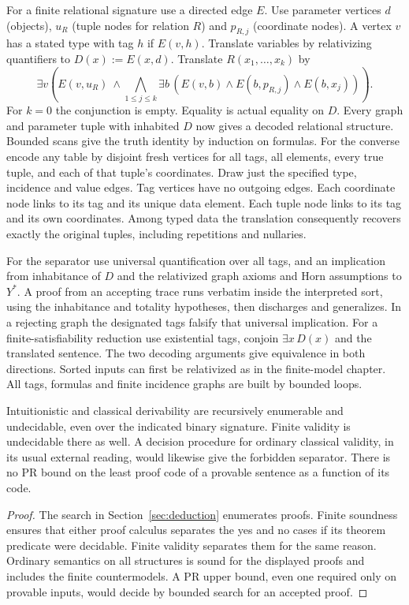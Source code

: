 For a finite relational signature use a directed edge $E$. Use parameter vertices $d$ (objects), $u_R$ (tuple nodes for relation $R$) and $p_{R,j}$ (coordinate nodes). A vertex $v$ has a stated type with tag $h$ if $E(v,h)$. Translate variables by relativizing quantifiers to $D(x):=E(x,d)$. Translate $R(x_1,\ldots,x_k)$ by
\[
 \exists v\left(E(v,u_R)\ \wedge \bigwedge_{1\le j\le k}\exists b\,
       (E(v,b)\wedge E(b,p_{R,j})\wedge E(b,x_j))\right).
\]
For $k=0$ the conjunction is empty. Equality is actual equality on $D$. Every graph and parameter tuple with inhabited $D$ now gives a decoded relational structure. Bounded scans give the truth identity by induction on formulas. For the converse encode any table by disjoint fresh vertices for all tags, all elements, every true tuple, and each of that tuple's coordinates. Draw just the specified type, incidence and value edges. Tag vertices have no outgoing edges. Each coordinate node links to its tag and its unique data element. Each tuple node links to its tag and its own coordinates. Among typed data the translation consequently recovers exactly the original tuples, including repetitions and nullaries.

For the separator use universal quantification over all tags, and an implication from inhabitance of $D$ and the relativized graph axioms and Horn assumptions to $Y^*$. A proof from an accepting trace runs verbatim inside the interpreted sort, using the inhabitance and totality hypotheses, then discharges and generalizes. In a rejecting graph the designated tags falsify that universal implication. For a finite-satisfiability reduction use existential tags, conjoin $\exists x\,D(x)$ and the translated sentence. The two decoding arguments give equivalence in both directions. Sorted inputs can first be relativized as in the finite-model chapter. All tags, formulas and finite incidence graphs are built by bounded loops.

\begin{corollary}
Intuitionistic and classical derivability are recursively enumerable and undecidable, even over the indicated binary signature. Finite validity is undecidable there as well. A decision procedure for ordinary classical validity, in its usual external reading, would likewise give the forbidden separator. There is no PR bound on the least proof code of a provable sentence as a function of its code.
\end{corollary}
\begin{proof}
The search in Section~\ref{sec:deduction} enumerates proofs. Finite soundness ensures that either proof calculus separates the yes and no cases if its theorem predicate were decidable. Finite validity separates them for the same reason. Ordinary semantics on all structures is sound for the displayed proofs and includes the finite countermodels. A PR upper bound, even one required only on provable inputs, would decide by bounded search for an accepted proof.
\end{proof}

